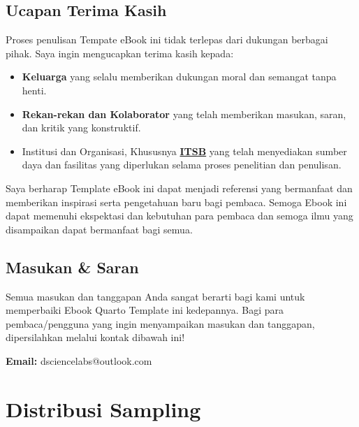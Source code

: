 \documentclass[
  indonesian,
  letterpaper,
]{book}
\providecommand{\tightlist}{%
  \setlength{\itemsep}{0pt}\setlength{\parskip}{0pt}}
\begin{document}
\section*{Ucapan Terima Kasih}\label{ucapan-terima-kasih}


Proses penulisan Tempate eBook ini tidak terlepas dari dukungan berbagai
pihak. Saya ingin mengucapkan terima kasih kepada:

\begin{itemize}
\tightlist
\item
  \textbf{Keluarga} yang selalu memberikan dukungan moral dan semangat
  tanpa henti.
\item
  \textbf{Rekan-rekan dan Kolaborator} yang telah memberikan masukan,
  saran, dan kritik yang konstruktif.
\item
  Institusi dan Organisasi, Khususnya
  \textbf{\href{https://itsb.ac.id/}{ITSB}} yang telah menyediakan
  sumber daya dan fasilitas yang diperlukan selama proses penelitian dan
  penulisan.
\end{itemize}

Saya berharap Template eBook ini dapat menjadi referensi yang bermanfaat
dan memberikan inspirasi serta pengetahuan baru bagi pembaca. Semoga
Ebook ini dapat memenuhi ekspektasi dan kebutuhan para pembaca dan
semoga ilmu yang disampaikan dapat bermanfaat bagi semua.

\section*{Masukan \& Saran}\label{masukan-saran}


Semua masukan dan tanggapan Anda sangat berarti bagi kami untuk
memperbaiki Ebook Quarto Template ini kedepannya. Bagi para
pembaca/pengguna yang ingin menyampaikan masukan dan tanggapan,
dipersilahkan melalui kontak dibawah ini!

\textbf{Email:} dsciencelabs@outlook.com


\chapter{Distribusi Sampling}\label{distribusi-sampling}

\end{document}
